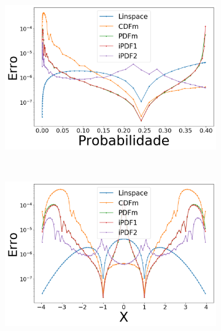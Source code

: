 \begin{figure}[H]
	\centering
	\begin{subfigure}[b]{0.45\textwidth}
		\centering 
		\includegraphics[width=\textwidth]{./figuras/error_normal_linear_Probabilidade}
		\caption{}
		\label{fig:11a}
	\end{subfigure}
	\hfill
	~ %
	\begin{subfigure}[b]{0.45\textwidth}
		\centering 
		\includegraphics[width=\textwidth]{./figuras/error_normal_linear_X}
		\caption{}
		\label{fig:11b}
	\end{subfigure}
	~ %

\end{figure}
